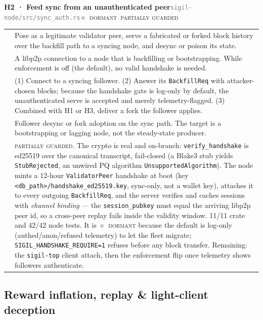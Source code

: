 \documentclass[10pt,a4paper]{article}
\makeatletter
\newcommand{\stD}{\textcolor{sigilviolet}{$\diamond$}~{\scriptsize\textcolor{sigilviolet}{\textsc{dormant}}}}
\newcommand{\svM}{{\scriptsize\textcolor{sigilamber}{\textsc{major}}}}
\newcommand{\mgPartial}{{\scriptsize\textcolor{sigilviolet}{\textsc{partially guarded}}}}
\newcommand{\frow}[2]{{\footnotesize\textcolor{gray}{\textsc{#1}}}\;&\small #2\\}
\newenvironment{atkentry}[5]{%
\begin{tcolorbox}[enhanced,breakable,colback=white,colframe=slate,boxrule=0.6pt,arc=2pt,
  left=8pt,right=8pt,top=6pt,bottom=6pt,
  borderline west={3pt}{0pt}{sigilred!60!slate}]
{\small\textbf{#1 · #2}\hfill{\footnotesize\textcolor{gray}{\texttt{#3}}}\quad#4\quad#5}\\[4pt]
\begin{tabular}{@{}>{\raggedleft\arraybackslash}p{2.1cm}p{12.9cm}@{}}
}{%
\end{tabular}
\end{tcolorbox}\vspace{2pt}}
\makeatother
\begin{document}
\begin{atkentry}{H2}{Feed sync from an unauthenticated peer}{sigil-node/src/sync\_auth.rs}{\svM}{\stD~\mgPartial}
\frow{goal}{Pose as a legitimate validator peer, serve a fabricated or forked block history
over the backfill path to a syncing node, and desync or poison its state.}
\frow{preconditions}{A libp2p connection to a node that is backfilling or bootstrapping.
While enforcement is off (the default), no valid handshake is needed.}
\frow{steps}{(1) Connect to a syncing follower. (2) Answer its \texttt{BackfillReq} with
attacker-chosen blocks; because the handshake gate is log-only by default, the
unauthenticated serve is accepted and merely telemetry-flagged. (3) Combined with H1 or H3,
deliver a fork the follower applies.}
\frow{buys}{Follower desync or fork adoption on the sync path. The target is a bootstrapping
or lagging node, not the steady-state producer.}
\frow{defense}{\mgPartial{}. The crypto is real and on-branch: \texttt{verify\_handshake} is
ed25519 over the canonical transcript, fail-closed (a Blake3 stub yields
\texttt{StubRejected}, an unwired PQ algorithm \texttt{UnsupportedAlgorithm}). The node
mints a 12-hour \texttt{ValidatorPeer} handshake at boot (key
\texttt{<db\_path>/handshake\_ed25519.key}, sync-only, not a wallet key), attaches it to
every outgoing \texttt{BackfillReq}, and the server verifies and caches sessions with
\emph{channel binding} — the \texttt{session\_pubkey} must equal the arriving libp2p peer
id, so a cross-peer replay fails inside the validity window. 11/11 crate and 42/42 node
tests. It is \stD{} because the default is log-only (authed/anon/refused telemetry) to let
the fleet migrate; \texttt{SIGIL\_HANDSHAKE\_REQUIRE=1} refuses before any block transfer.
Remaining: the \texttt{sigil-top} client attach, then the enforcement flip once telemetry
shows followers authenticate.}
\end{atkentry}

\subsection{Reward inflation, replay \& light-client deception}
\end{document}
